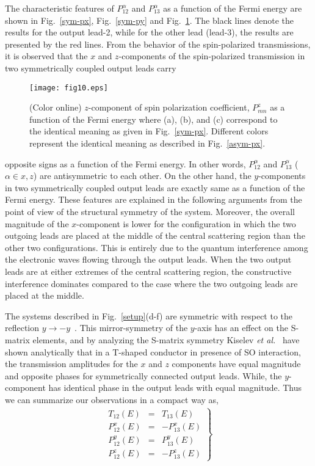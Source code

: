\documentclass[prb,aps,twocolumn,amsmath,amssymb,floatfix,
superscriptaddress]{revtex4}
\begin{document}
The characteristic features of $P^\alpha_{12}$ and $P^\alpha_{13}$ as
a function of the Fermi energy are shown in Fig.~\ref{sym-px},
Fig.~\ref{sym-py} and Fig.~\ref{sym-pz}. The black lines denote the
results for the output lead-2, while for the other lead (lead-3), the
results are presented by the red lines. From the behavior of the
spin-polarized transmissions, it is observed that the $x$ and
$z$-components of the spin-polarized transmission in two symmetrically
coupled output leads carry
\begin{figure}[h]
\centering
\texttt{[image: fig10.eps]}
\caption{(Color online) $z$-component of spin polarization
  coefficient, $P^z_{mn}$ as a function of the Fermi energy where (a),
  (b), and (c) correspond to the identical meaning as given in
  Fig.~\ref{sym-px}. Different colors represent the identical meaning
  as described in Fig.~\ref{asym-px}.}
\label{sym-pz}
\end{figure}
opposite signs as a function of the Fermi energy. In other words,
$P^\alpha_{12}$ and $P^\alpha_{13}$ ($\alpha\in x,z$) are
antisymmetric to each other. On the other hand, the $y$-components in
two symmetrically coupled output leads are exactly same as a function
of the Fermi energy. These features are explained in the following
arguments from the point of view of the structural symmetry of the
system. Moreover, the overall magnitude of the $x$-component is
  lower for the configuration in which the two outgoing leads are
  placed at the middle of the central scattering region than the other
  two configurations. This is entirely due to the quantum interference
  among the electronic waves flowing through the output leads. When
  the two output leads are at either extremes of the central
  scattering region, the constructive interference dominates compared
  to the case where the two outgoing leads are placed at the middle.


The systems described in Fig.~\ref{setup}(d-f) are symmetric with
respect to the reflection $y\rightarrow -y$~\cite{kim-jap}. This
mirror-symmetry of the $y$-axis has an effect on the S-matrix
elements, and by analyzing the S-matrix symmetry Kiselev {\it et
  al.}~\cite{kim-jap} have shown analytically that in a T-shaped
conductor in presence of SO interaction, the transmission amplitudes
for the $x$ and $z$ components have equal magnitude and opposite
phases for symmetrically connected output leads. While, the
$y$-component has identical phase in the output leads with equal
magnitude. Thus we can summarize our observations in a compact way as,
\begin{eqnarray}
\left. 
\begin{aligned}
T_{12}(E) &=& T_{13}(E)\\
P^x_{12}(E) &=& -P^x_{13}(E)\\
 P^y_{12}(E) &=& P^y_{13}(E) \\
P^z_{12}(E) &=& -P^z_{13}(E) 
\end{aligned}
\right\}
\label{result}
\end{eqnarray}
\end{document}
